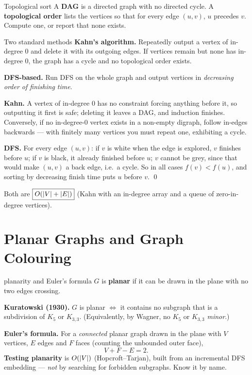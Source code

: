 \begin{prob}{Topological sort}
A \textbf{DAG} is a directed graph with no directed cycle. A \textbf{topological order} lists the
vertices so that for every edge $(u,v)$, $u$ precedes $v$. Compute one, or report that none
exists.
\end{prob}

\begin{algo}{Two standard methods}
\textbf{Kahn's algorithm.} Repeatedly output a vertex of in-degree $0$ and delete it with its
outgoing edges. If vertices remain but none has in-degree $0$, the graph has a cycle and no
topological order exists.

\textbf{DFS-based.} Run DFS on the whole graph and output vertices in \emph{decreasing order of
finishing time}.
\end{algo}

\begin{correct}
\textbf{Kahn.} A vertex of in-degree $0$ has no constraint forcing anything before it, so
outputting it first is safe; deleting it leaves a DAG, and induction finishes. Conversely, if no
in-degree-$0$ vertex exists in a non-empty digraph, follow in-edges backwards --- with finitely
many vertices you must repeat one, exhibiting a cycle.

\textbf{DFS.} For every edge $(u,v)$: if $v$ is white when the edge is explored, $v$ finishes
before $u$; if $v$ is black, it already finished before $u$; $v$ cannot be grey, since that would
make $(u,v)$ a back edge, i.e.\ a cycle. So in all cases $f(v)<f(u)$, and sorting by decreasing
finish time puts $u$ before $v$. \qed
\end{correct}

\begin{cplx}
Both are $\boxed{O(|V|+|E|)}$ (Kahn with an in-degree array and a queue of zero-in-degree
vertices).
\end{cplx}

\section{Planar Graphs and Graph Colouring}

\begin{facts}{planarity and Euler's formula}
$G$ is \textbf{planar} if it can be drawn in the plane with no two edges crossing.

\textbf{Kuratowski (1930).} $G$ is planar $\iff$ it contains no subgraph that is a subdivision of
$K_5$ or $K_{3,3}$. (Equivalently, by Wagner, no $K_5$ or $K_{3,3}$ \emph{minor}.)

\textbf{Euler's formula.} For a \emph{connected} planar graph drawn in the plane with $V$
vertices, $E$ edges and $F$ faces (counting the unbounded outer face),
\[
  \boxed{V+F-E=2.}
\]
\textbf{Testing planarity} is $O(|V|)$ (Hopcroft--Tarjan), built from an incremental DFS
embedding --- \emph{not} by searching for forbidden subgraphs. Know it by name.
\end{facts}

